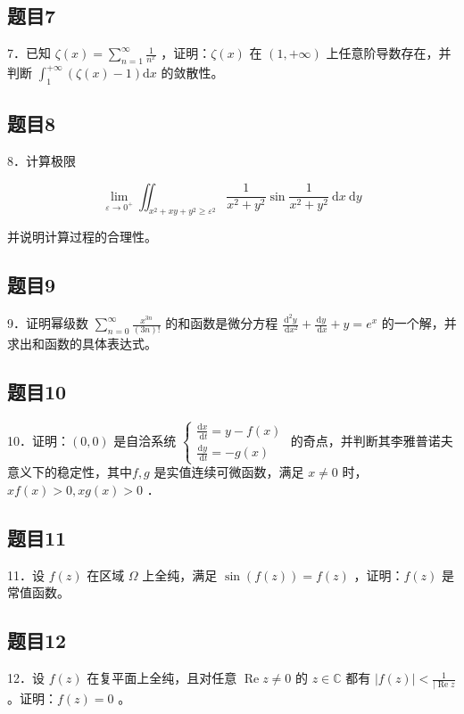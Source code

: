\documentclass{article}
\begin{document}
\subsection{题目7}
7．已知 \(\zeta(x)=\sum_{n=1}^{\infty} \frac{1}{n^{x}}\) ，证明：\(\zeta(x)\) 在 \((1,+\infty)\) 上任意阶导数存在，并判断 \(\int_{1}^{+\infty}(\zeta(x)-1) \mathrm{d} x\) 的敛散性。

\subsection{题目8}
8．计算极限

\[
\lim _{\varepsilon \rightarrow 0^{+}} \iint_{x^{2}+x y+y^{2} \geq \varepsilon^{2}} \frac{1}{x^{2}+y^{2}} \sin \frac{1}{x^{2}+y^{2}} \mathrm{~d} x \mathrm{~d} y
\]

并说明计算过程的合理性。

\subsection{题目9}
9．证明幂级数 \(\sum_{n=0}^{\infty} \frac{x^{3 n}}{(3 n)!}\) 的和函数是微分方程 \(\frac{\mathrm{d}^{2} y}{\mathrm{~d} x^{2}}+\frac{\mathrm{d} y}{\mathrm{~d} x}+y=e^{x}\) 的一个解，并求出和函数的具体表达式。

\subsection{题目10}
10．证明：\((0,0)\) 是自洽系统 \(\left\{\begin{array}{l}\frac{\mathrm{d} x}{\mathrm{~d} t}=y-f(x) \\ \frac{\mathrm{d} y}{\mathrm{~d} t}=-g(x)\end{array}\right.\) 的奇点，并判断其李雅普诺夫意义下的稳定性，其中\(f, g\) 是实值连续可微函数，满足 \(x \neq 0\) 时，\(x f(x)>0, x g(x)>0\) ．

\subsection{题目11}
11．设 \(f(z)\) 在区域 \(\Omega\) 上全纯，满足 \(\sin (f(z))=f(z)\) ，证明：\(f(z)\) 是常值函数。

\subsection{题目12}
12．设 \(f(z)\) 在复平面上全纯，且对任意 \(\operatorname{Re} z \neq 0\) 的 \(z \in \mathbb{C}\) 都有 \(|f(z)|<\frac{1}{\mid \operatorname{Re} z}\) 。证明：\(f(z)=0\) 。
\end{document}
